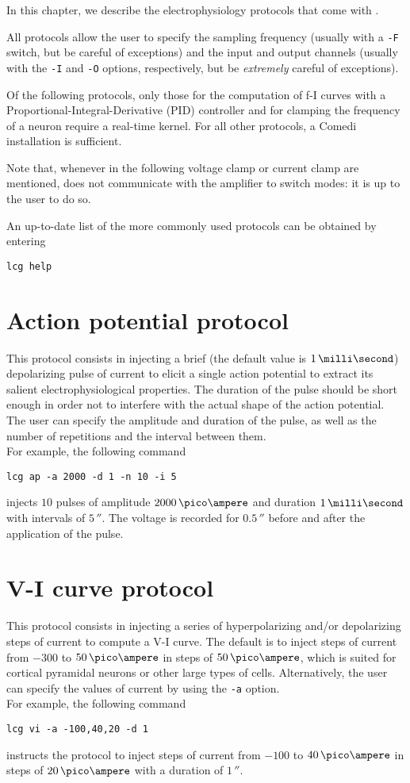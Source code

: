 In this chapter, we describe the electrophysiology protocols that come
with \progname.

All protocols allow the user to
specify the sampling frequency (usually with a \verb+-F+ switch,
but be careful of exceptions) and the input and output channels
(usually with the \verb+-I+ and \verb+-O+ options, respectively,
but be \emph{extremely} careful of exceptions).

Of the following protocols, only those for the computation of f-I
curves with a Proportional-Integral-Derivative (PID) controller and
for clamping the frequency of a neuron require a real-time kernel. For
all other protocols, a Comedi installation is sufficient.

Note that, whenever in the following voltage clamp or current clamp
are mentioned, \progname does not communicate with the amplifier to
switch modes: it is up to the user to do so.

An up-to-date list of the more commonly used protocols can be obtained
by entering
\begin{lstlisting}
lcg help
\end{lstlisting}

\section{Action potential protocol}
This protocol consists in injecting a brief (the default value is
$1\,\milli\second$) depolarizing pulse of current to elicit a single
action potential to extract its salient electrophysiological
properties. The duration of the pulse should be short enough in order
not to interfere with the actual shape of the action potential. The
user can specify the amplitude and duration of the pulse, as well as
the number of repetitions and the interval between them.\\
For example, the following command
\begin{lstlisting}
lcg ap -a 2000 -d 1 -n 10 -i 5
\end{lstlisting}
injects $10$ pulses of amplitude $2000\,\pico\ampere$ and duration
$1\,\milli\second$ with intervals of $5\,\second$. The voltage is
recorded for $0.5\,\second$ before and after the application of the pulse.

\section{V-I curve protocol}
This protocol consists in injecting a series of hyperpolarizing and/or
depolarizing steps of current to compute a V-I curve. The default
is to inject steps of current from $-300$ to $50\,\pico\ampere$ in
steps of $50\,\pico\ampere$, which is suited for cortical pyramidal
neurons or other large types of cells. Alternatively, the user can
specify the values of current by using the \verb+-a+ option.\\
For example, the following command
\begin{lstlisting}
lcg vi -a -100,40,20 -d 1
\end{lstlisting}
instructs the protocol to inject steps of current from $-100$ to
$40\,\pico\ampere$ in steps of $20\,\pico\ampere$ with a duration of
$1\,\second$.

